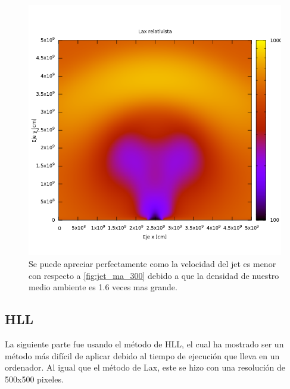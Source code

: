 \documentclass[12pt,a4paper]{book}
\begin{document}
\begin{figure}[H] \label{fig:jet_100_t_20_ma_500}%
\centering
\includegraphics[scale=0.5]{./Figuras/Pruebas/Prueba_jet/lax/jet_100_t_20_ma_500} 
\caption{Se puede apreciar perfectamente como la velocidad del jet es menor con respecto a \ref{fig:jet_ma_300} debido a que la densidad de nuestro medio ambiente es 1.6 veces mas grande.}
\end{figure}

\subsection{HLL}

La siguiente parte fue usando el método de HLL, el cual ha mostrado ser un método más difícil de aplicar debido al tiempo de ejecución que lleva en un ordenador. Al igual que el método de Lax, este se hizo con una resolución de 500x500 pixeles.
\end{document}
